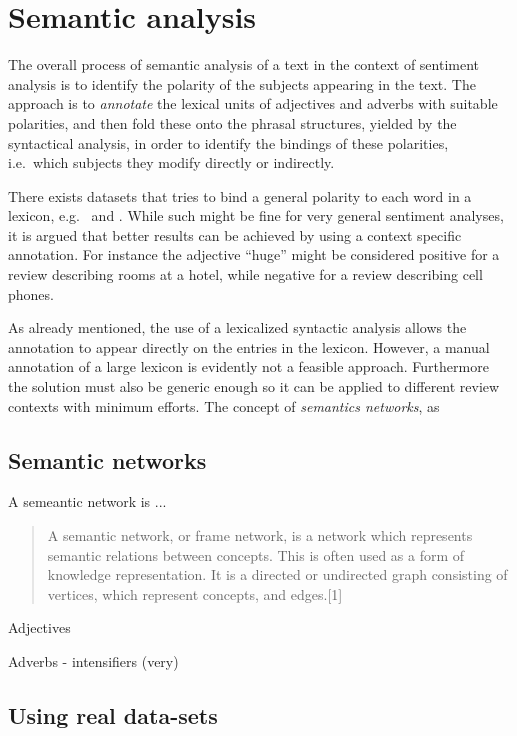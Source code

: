 
\section{Semantic analysis}
The overall process of semantic analysis of a text in the context of sentiment analysis is to identify the polarity of the subjects appearing in the text. The approach is to \emph{annotate} the lexical units of adjectives and adverbs with suitable polarities, and then fold these onto the phrasal structures, yielded by the syntactical analysis, in order to identify the bindings of these polarities, i.e.\ which subjects they modify directly or indirectly.

There exists datasets that tries to bind a general polarity to each word in a lexicon, e.g.\ \cite{sentiWordNet} and \cite{sentiWordNet3}. While such might be fine for very general sentiment analyses, it is argued that better results can be achieved by using a context specific annotation. For instance the adjective ``huge'' might be considered positive for a review describing rooms at a hotel, while negative for a review  describing cell phones. 

As already mentioned, the use of a lexicalized syntactic analysis allows the annotation to appear directly on the entries in the lexicon. However, a manual annotation of a large lexicon is evidently not a feasible approach. Furthermore the solution must also be generic enough so it can be applied to different review contexts with minimum efforts. The concept of \emph{semantics networks}, as 
\cite[p.~454--456]{ai}
\subsection*{Semantic networks}
A semeantic network is ...
\begin{quote}
  A semantic network, or frame network, is a network which represents semantic relations between concepts. This is often used as a form of knowledge representation. It is a directed or undirected graph consisting of vertices, which represent concepts, and edges.[1]
\end{quote}

Adjectives 

Adverbs
- intensifiers (very)

\subsection*{Using real data-sets}

